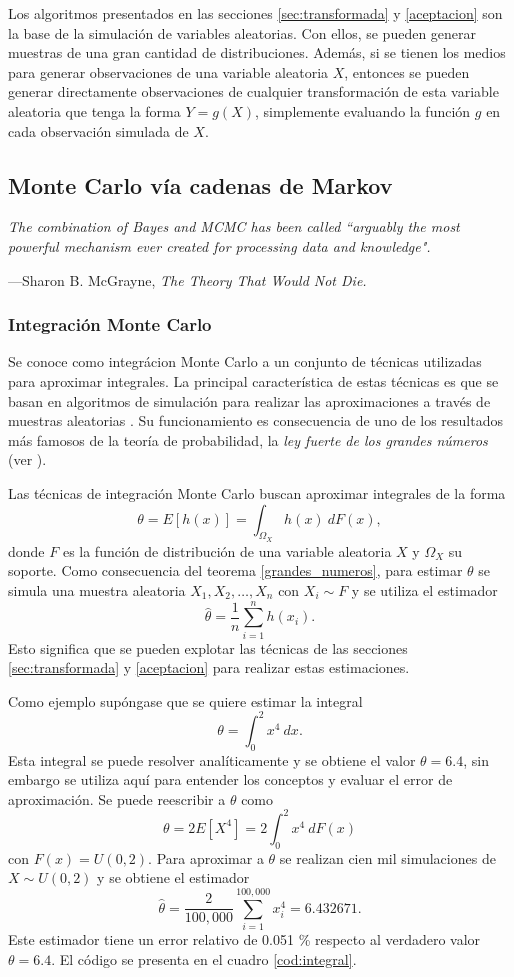 \documentclass[11pt,a4paper]{article}
\begin{document}
Los algoritmos presentados en las secciones \ref{sec:transformada} y \ref{aceptacion} son la base de la simulación de variables aleatorias. Con ellos, se pueden generar muestras de una gran cantidad de distribuciones. Además, si se tienen los medios para generar observaciones de una variable aleatoria $X$, entonces se pueden generar directamente observaciones de cualquier transformación de esta variable aleatoria que tenga la forma $Y = g(X)$, simplemente evaluando la función $g$ en cada observación simulada de $X$.

\subsection{Monte Carlo vía cadenas de Markov}	
\label{sec_cadenas}
\epigraph{\itshape The combination of Bayes and MCMC has been called ``arguably the most powerful mechanism ever created for processing data and knowledge".}{---Sharon B. McGrayne, \textit{The Theory That Would Not Die.}}
\subsubsection*{Integración Monte Carlo}

Se conoce como integrácion Monte Carlo a un conjunto de técnicas utilizadas para aproximar integrales. La principal característica de estas técnicas es que se basan en algoritmos de simulación para realizar las aproximaciones a través de muestras aleatorias \citep{casella}. Su funcionamiento es consecuencia de uno de los resultados más famosos de la teoría de probabilidad, la \textit{ley fuerte de los grandes números} (ver \citet{feller}).

Las técnicas de integración Monte Carlo buscan aproximar integrales de la forma
$$\theta = E[h(x)] = \int_{\Omega_X} h(x) \ dF(x),$$ donde $F$ es la función de distribución de una variable aleatoria $X$ y $\Omega_X$ su soporte. Como consecuencia del teorema \ref{grandes_numeros}, para estimar $\theta$ se simula una muestra aleatoria $X_1, X_2, \dots, X_n$ con $X_i\sim F$ y se utiliza el estimador $$\hat{\theta} = \frac{1}{n}\sum_{i=1}^n h(x_i).$$ Esto significa que se pueden explotar las técnicas de las secciones \ref{sec:transformada} y \ref{aceptacion} para realizar estas estimaciones.

Como ejemplo supóngase que se quiere estimar la integral
\begin{equation}\label{eq:integral}
\theta = \int_0^2 x^4 \ dx.
\end{equation}
Esta integral se puede resolver analíticamente y se obtiene el valor $\theta = 6.4$, sin embargo se utiliza aquí para entender los conceptos y evaluar el error de aproximación. Se puede reescribir a $\theta$ como $$\theta = 2E[X^4] =  2\int_0^2 x^4 \ dF(x)$$ con $F(x) = U(0,2).$ Para aproximar a $\theta$ se realizan cien mil simulaciones de $X\sim U(0,2)$ y se obtiene el estimador $$\hat{\theta} = \frac{2}{100,000}\sum_{i=1}^{100,000} x_i^4 = 6.432671.$$ Este estimador tiene un error relativo de 0.051 \% respecto al verdadero valor $\theta = 6.4$. El código se presenta en el cuadro \ref{cod:integral}.
\end{document}
